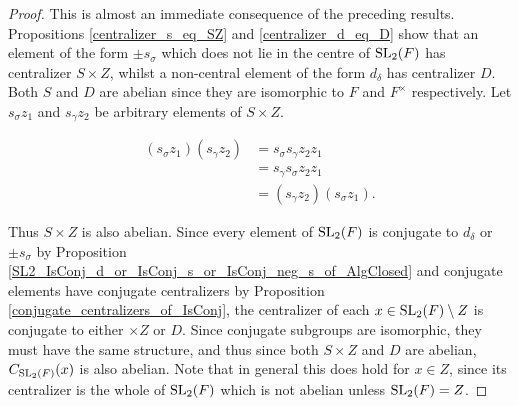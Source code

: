 \begin{proof}
    \leanok
    This is almost an immediate consequence of the preceding results. Propositions \ref{centralizer_s_eq_SZ} and \ref{centralizer_d_eq_D} show that an element of the form $\pm s_\sigma$ which does not lie in the centre of $\operatorname{SL}_2(F)$ has centralizer $S \times Z$, whilst a non-central element of the form $d_\delta$ has centralizer $D$.
Both $S$ and $D$ are abelian since they are isomorphic to $F$ and $F^\times$ respectively. Let $s_\sigma z_1$ and $s_\gamma z_2$  be arbitrary elements of $S \times Z$.

\vspace{-.5mm}
\begin{align*} 
    (s_\sigma z_1)(s_\gamma z_2)  &= s_\sigma s_\gamma z_2 z_1  \tag{since  $z_1 \in Z$}
\\ &= s_\gamma s_\sigma z_2 z_1  \tag{since  $S$ is abelian}
\\ &= (s_\gamma z_2)(s_\sigma z_1).   \tag{since  $z_2 \in Z$}
\end{align*} 

Thus $S \times Z$ is also abelian. Since every element of $\operatorname{SL}_2(F)$ is conjugate to $d_\delta$ or $\pm s_\sigma$ by Proposition \ref{SL2_IsConj_d_or_IsConj_s_or_IsConj_neg_s_of_AlgClosed} and conjugate elements have conjugate centralizers by Proposition \ref{conjugate_centralizers_of_IsConj}, the centralizer of each $x \in \operatorname{SL}_2(F)\setminus Z$ is conjugate to either $\times Z$ or $D$. 
Since conjugate subgroups are isomorphic, they must have the same structure, and thus since both $S \times Z$ and $D$ are abelian, $C_{\operatorname{SL}_2(F)}(x)$ is also abelian. 
Note that in general this does hold for $x \in Z$, since its centralizer is the whole of $\operatorname{SL}_2(F)$ which is not abelian unless $\operatorname{SL}_2(F)= Z$.

\end{proof}
